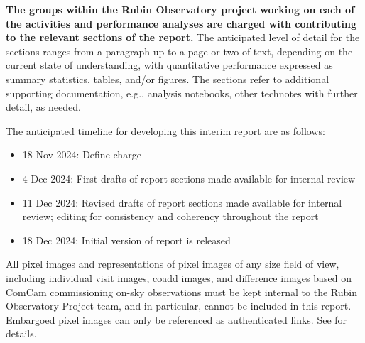 \textbf{The groups within the Rubin Observatory project working on each of the activities and performance analyses are charged with contributing to the relevant sections of the report.}
The anticipated level of detail for the sections ranges from a paragraph up to a page or two of text, depending on the current state of understanding, with quantitative performance expressed as summary statistics, tables, and/or figures.
The sections refer to additional supporting documentation, e.g., analysis notebooks, other technotes with further detail, as needed.

The anticipated timeline for developing this interim report are as follows:

\begin{itemize}

    \item 18 Nov 2024: Define charge

    \item 4 Dec 2024: First drafts of report sections made available for internal review

    \item 11 Dec 2024: Revised drafts of report sections made available for internal review; editing for consistency and coherency throughout the report

    \item 18 Dec 2024: Initial version of report is released

\end{itemize}

\begin{warning}
    All pixel images and representations of pixel images of any size field of view, including individual visit images, coadd images, and difference images based on ComCam commissioning on-sky observations must be kept internal to the Rubin Observatory Project team, and in particular, cannot be included in this report.
    Embargoed pixel images can only be referenced as authenticated links.
    See  for details.
\end{warning}